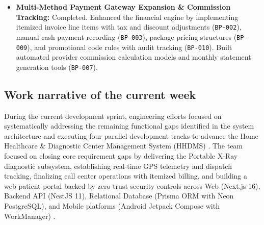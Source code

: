 \documentclass[onecolumn,journal]{IEEEtran}
\begin{document}
\begin{itemize}
		\item \textbf{Multi-Method Payment Gateway Expansion \& Commission Tracking:} Completed. Enhanced the financial engine by implementing itemized invoice line items with tax and discount adjustments (\texttt{BP-002}), manual cash payment recording (\texttt{BP-003}), package pricing structures (\texttt{BP-009}), and promotional code rules with audit tracking (\texttt{BP-010}). Built automated provider commission calculation models and monthly statement generation tools (\texttt{BP-007}).
	\end{itemize}
	
	\subsection{Work narrative of the current week}
	During the current development sprint, engineering efforts focused on systematically addressing the remaining functional gaps identified in the system architecture and executing four parallel development tracks to advance the Home Healthcare \& Diagnostic Center Management System (HHDMS) \cite{srs2026}. The team focused on closing core requirement gaps by delivering the Portable X-Ray diagnostic subsystem, establishing real-time GPS telemetry and dispatch tracking, finalizing call center operations with itemized billing, and building a web patient portal backed by zero-trust security controls across Web (Next.js 16), Backend API (NestJS 11), Relational Database (Prisma ORM with Neon PostgreSQL), and Mobile platforms (Android Jetpack Compose with WorkManager) \cite{srs2026}.
\end{document}
